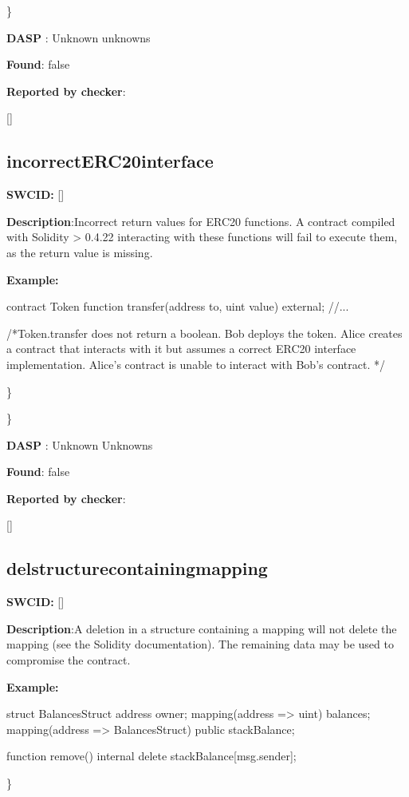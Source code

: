 \documentclass{article}
\begin{document}
\} 

\textbf{DASP} : Unknown unknowns

\textbf{Found}: false

\textbf{Reported by checker}: 
\begin{ffcode} 

[]
\end{ffcode} 
\subsection{incorrect{\textunderscore}ERC20{\textunderscore}interface} 
\textbf{SWC{\textunderscore}ID:} []

\textbf{Description}:Incorrect return values for ERC20 functions. A contract compiled with Solidity > 0.4.22 interacting with these functions will fail to execute them, as the return value is missing.


\textbf{Example:} 
\begin{ffcode} 

contract Token{
    function transfer(address to, uint value) external;
    //...
}

 /*Token.transfer does not return a boolean. Bob deploys the token. Alice creates a contract that interacts with it but assumes a correct ERC20 interface implementation. Alice's contract is unable to interact with Bob's contract. */ 

\end{ffcode} 
\} 

\} 

\textbf{DASP} : Unknown Unknowns

\textbf{Found}: false

\textbf{Reported by checker}: 
\begin{ffcode} 

[]
\end{ffcode} 
\subsection{del{\textunderscore}structure{\textunderscore}containing{\textunderscore}mapping} 
\textbf{SWC{\textunderscore}ID:} []

\textbf{Description}:A deletion in a structure containing a mapping will not delete the mapping (see the Solidity documentation). The remaining data may be used to compromise the contract.


\textbf{Example:} 
\begin{ffcode} 

struct BalancesStruct{
    address owner;
    mapping(address => uint) balances;
}
mapping(address => BalancesStruct) public stackBalance;

function remove() internal{
      delete stackBalance[msg.sender];
}

\end{ffcode} 
\} 
\end{document}
